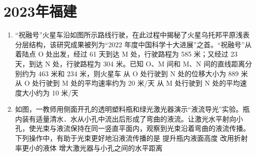\documentclass[\gkver]{gaokaozhenti}
\begin{document}
\chapter{2023年福建}

\begin{enumerate}
\item
“祝融号”火星车沿如图所示路线行驶，在此过程中揭秘了火星乌托邦平原浅表分层结构，该研究成果被列为“2022 年度中国科学十大进展”之首。“祝融号”从着陆点 O 处出发，经过 61 天到达 M 处，行驶路程为 585 米；又经过 23 天，到达 N 处，行驶路程为 304 米。已知 O、M 间和 M、N 间的直线距离分别约为 463 米和 234 米，则火星车
{从 O 处行驶到 N 处的位移大小为 889 米}
{从 O 处行驶到 M 处的平均速率约为 20 米/天}
{从 M 处行驶到 N 处的平均速度大小约为 10 米/天}

\item
如图，一教师用侧面开孔的透明塑料瓶和绿光激光器演示“液流导光”实验。瓶内装有适量清水．水从小孔中流出后形成了弯曲的液流。让激光水平射向小孔，使光束与液流保持在同一竖直平面内，观察到光束沿着弯曲的液流传播。下列操作中，有助于光束更好地沿液流传播的是
{提升瓶内液面高度}
{改用折射率更小的液体}
{增大激光器与小孔之间的水平距离}
\end{enumerate}
\end{document}
